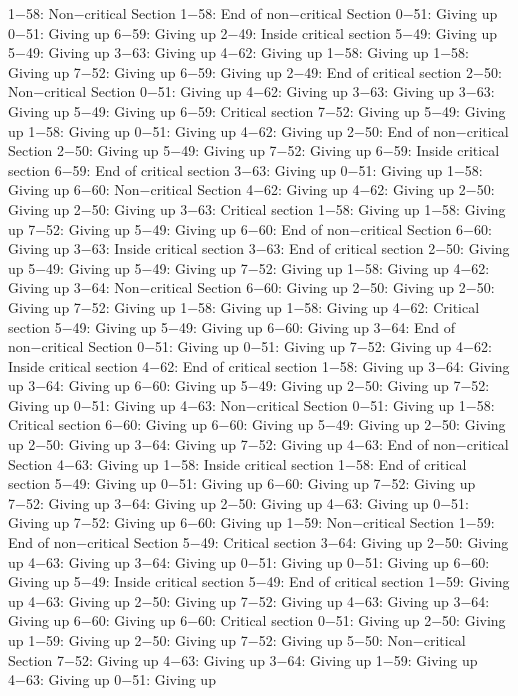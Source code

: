1−58: Non−critical Section
1−58: End of non−critical Section
0−51: Giving up
0−51: Giving up
6−59: Giving up
2−49: Inside critical section
5−49: Giving up
5−49: Giving up
3−63: Giving up
4−62: Giving up
1−58: Giving up
1−58: Giving up
7−52: Giving up
6−59: Giving up
2−49: End of critical section
2−50: Non−critical Section
0−51: Giving up
4−62: Giving up
3−63: Giving up
3−63: Giving up
5−49: Giving up
6−59: Critical section
7−52: Giving up
5−49: Giving up
1−58: Giving up
0−51: Giving up
4−62: Giving up
2−50: End of non−critical Section
2−50: Giving up
5−49: Giving up
7−52: Giving up
6−59: Inside critical section
6−59: End of critical section
3−63: Giving up
0−51: Giving up
1−58: Giving up
6−60: Non−critical Section
4−62: Giving up
4−62: Giving up
2−50: Giving up
2−50: Giving up
3−63: Critical section
1−58: Giving up
1−58: Giving up
7−52: Giving up
5−49: Giving up
6−60: End of non−critical Section
6−60: Giving up
3−63: Inside critical section
3−63: End of critical section
2−50: Giving up
5−49: Giving up
5−49: Giving up
7−52: Giving up
1−58: Giving up
4−62: Giving up
3−64: Non−critical Section
6−60: Giving up
2−50: Giving up
2−50: Giving up
7−52: Giving up
1−58: Giving up
1−58: Giving up
4−62: Critical section
5−49: Giving up
5−49: Giving up
6−60: Giving up
3−64: End of non−critical Section
0−51: Giving up
0−51: Giving up
7−52: Giving up
4−62: Inside critical section
4−62: End of critical section
1−58: Giving up
3−64: Giving up
3−64: Giving up
6−60: Giving up
5−49: Giving up
2−50: Giving up
7−52: Giving up
0−51: Giving up
4−63: Non−critical Section
0−51: Giving up
1−58: Critical section
6−60: Giving up
6−60: Giving up
5−49: Giving up
2−50: Giving up
2−50: Giving up
3−64: Giving up
7−52: Giving up
4−63: End of non−critical Section
4−63: Giving up
1−58: Inside critical section
1−58: End of critical section
5−49: Giving up
0−51: Giving up
6−60: Giving up
7−52: Giving up
7−52: Giving up
3−64: Giving up
2−50: Giving up
4−63: Giving up
0−51: Giving up
7−52: Giving up
6−60: Giving up
1−59: Non−critical Section
1−59: End of non−critical Section
5−49: Critical section
3−64: Giving up
2−50: Giving up
4−63: Giving up
3−64: Giving up
0−51: Giving up
0−51: Giving up
6−60: Giving up
5−49: Inside critical section
5−49: End of critical section
1−59: Giving up
4−63: Giving up
2−50: Giving up
7−52: Giving up
4−63: Giving up
3−64: Giving up
6−60: Giving up
6−60: Critical section
0−51: Giving up
2−50: Giving up
1−59: Giving up
2−50: Giving up
7−52: Giving up
5−50: Non−critical Section
7−52: Giving up
4−63: Giving up
3−64: Giving up
1−59: Giving up
4−63: Giving up
0−51: Giving up
